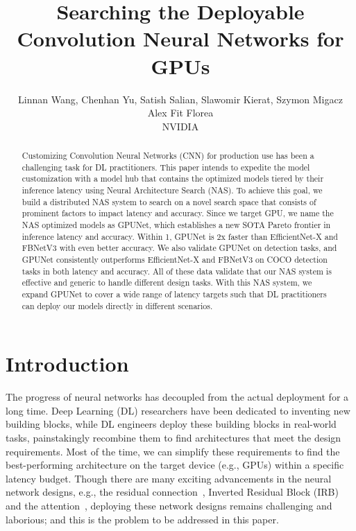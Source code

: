 \documentclass[10pt,twocolumn,letterpaper]{article}
\begin{document}
\title{Searching the Deployable Convolution Neural Networks for GPUs}

\author{Linnan Wang, Chenhan Yu, Satish Salian, Slawomir Kierat, Szymon Migacz  \\ Alex Fit Florea\\
NVIDIA\\
}
\maketitle

\begin{abstract}
Customizing Convolution Neural Networks (CNN) for production use has been a challenging task for DL practitioners. This paper intends to expedite the model customization with a model hub that contains the optimized models tiered by their inference latency using Neural Architecture Search (NAS). To achieve this goal, we build a distributed NAS system to search on a novel search space that consists of prominent factors to impact latency and accuracy. Since we target GPU, we name the NAS optimized models as GPUNet, which establishes a new SOTA Pareto frontier in inference latency and accuracy. Within 1, GPUNet is 2x faster than EfficientNet-X and FBNetV3 with even better accuracy. We also validate GPUNet on detection tasks, and GPUNet consistently outperforms EfficientNet-X and FBNetV3 on COCO detection tasks in both latency and accuracy. All of these data validate that our NAS system is effective and generic to handle different design tasks. With this NAS system, we expand GPUNet to cover a wide range of latency targets such that DL practitioners can deploy our models directly in different scenarios.
\end{abstract}

\section{Introduction}
\label{sec:intro}

The progress of neural networks has decoupled from the actual deployment for a long time. Deep Learning (DL) researchers have been dedicated to inventing new building blocks, while DL engineers deploy these building blocks in real-world tasks, painstakingly recombine them to find architectures that meet the design requirements. Most of the time, we can simplify these requirements to find the best-performing architecture on the target device (e.g., GPUs) within a specific latency budget. Though there are many exciting advancements in the neural network designs, e.g., the residual connection~\cite{he2016deep}, Inverted Residual Block (IRB)~\cite{sandler2018mobilenetv2} and the attention~\cite{vaswani2017attention}, deploying these network designs remains challenging and laborious; and this is the problem to be addressed in this paper.
\end{document}
